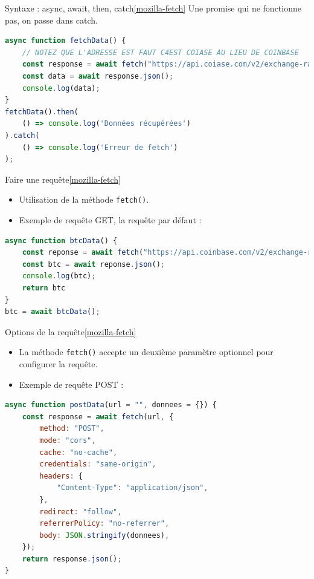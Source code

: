 \documentclass{beamer}
\begin{document}
    \begin{frame}[fragile]{Syntaxe : async, await, then, catch\cref{mozilla-fetch}}
        Une promise qui ne fonctionne pas, on passe dans catch.
        \begin{lstlisting}[language=JavaScript,title={\tiny{Script JavaScript}}]
async function fetchData() {
    // NOTEZ QUE L'ADRESSE EST FAUT C4EST COIASE AU LIEU DE COINBASE
    const response = await fetch("https://api.coiase.com/v2/exchange-rates?currency=BTC");
    const data = await response.json();
    console.log(data);
}
fetchData().then(
    () => console.log('Données récupérées')
).catch(
    () => console.log('Erreur de fetch')
);
        \end{lstlisting}
    \end{frame}

    \begin{frame}[fragile]{Faire une requête\cref{mozilla-fetch}}
        \begin{itemize}
            \item Utilisation de la méthode \lstinline{fetch()}.
            \item Exemple de requête GET, la requête par défaut :
        \end{itemize}
        \begin{lstlisting}[language=JavaScript,title={\tiny{Script JavaScript}}]
async function btcData() {
    const reponse = await fetch("https://api.coinbase.com/v2/exchange-rates?currency=BTC");
    const btc = await reponse.json();
    console.log(btc);
    return btc
}
btc = await btcData();
        \end{lstlisting}
    \end{frame}

    \begin{frame}[fragile]{Options de la requête\cref{mozilla-fetch}}
        \begin{itemize}
            \item La méthode \lstinline{fetch()} accepte un deuxième paramètre optionnel pour configurer la requête.
            \item Exemple de requête POST :
        \end{itemize}
        \begin{lstlisting}[language=JavaScript,title={\tiny{Script JavaScript}}]
async function postData(url = "", donnees = {}) {
    const response = await fetch(url, {
        method: "POST",
        mode: "cors",
        cache: "no-cache",
        credentials: "same-origin",
        headers: {
            "Content-Type": "application/json",
        },
        redirect: "follow",
        referrerPolicy: "no-referrer",
        body: JSON.stringify(donnees),
    });
    return response.json();
}
        \end{lstlisting}
    \end{frame}
\end{document}

